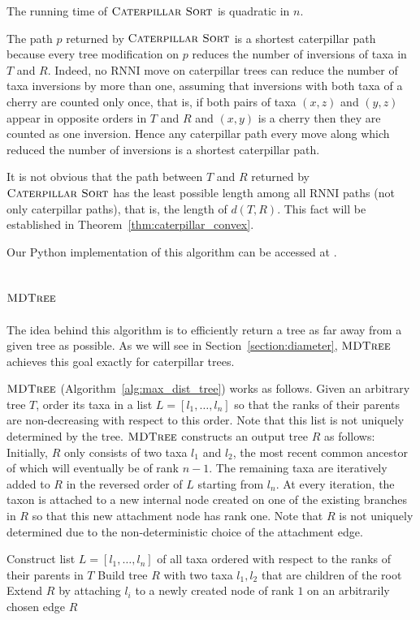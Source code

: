\documentclass{amsart}
\newcommand{\rnni}{\mathrm{RNNI}}
\newcommand{\csort}{\textsc{Caterpillar Sort}}
\newcommand{\mdtree}{\textsc{MDTree}}
\begin{document}
The running time of $\csort$ is quadratic in $n$.

The path $p$ returned by $\csort$ is a shortest caterpillar path because every tree modification on $p$ reduces the number of inversions of taxa in $T$ and $R$.
Indeed, no $\rnni$ move on caterpillar trees can reduce the number of taxa inversions by more than one, assuming that inversions with both taxa of a cherry are counted only once, that is, if both pairs of taxa $(x, z)$ and $(y, z)$ appear in opposite orders in $T$ and $R$ and $(x,y)$ is a cherry then they are counted as one inversion.
Hence any caterpillar path every move along which reduced the number of inversions is a shortest caterpillar path.

It is not obvious that the path between $T$ and $R$ returned by $\csort$ has the least possible length among all $\rnni$ paths (not only caterpillar paths), that is, the length of $d(T, R)$.
This fact will be established in Theorem~\ref{thm:caterpillar_convex}.

Our Python implementation of this algorithm can be accessed at \autocite{Collienne2019}.


\subsection{$\mdtree$}
\label{section:alg_mdtree}

The idea behind this algorithm is to efficiently return a tree as far away from a given tree as possible.
As we will see in Section~\ref{section:diameter}, $\mdtree$ achieves this goal exactly for caterpillar trees.

$\mdtree$ (Algorithm~\ref{alg:max_dist_tree}) works as follows.
Given an arbitrary tree $T$, order its taxa in a list $L = [l_1, \ldots, l_n]$ so that the ranks of their parents are non-decreasing with respect to this order.
Note that this list is not uniquely determined by the tree.
$\mdtree$ constructs an output tree $R$ as follows:
Initially, $R$ only consists of two taxa $l_1$ and $l_2$, the most recent common ancestor of which will eventually be of rank $n - 1$.
The remaining taxa are iteratively added to $R$ in the reversed order of $L$ starting from $l_n$.
At every iteration, the taxon is attached to a new internal node created on one of the existing branches in $R$ so that this new attachment node has rank one.
Note that $R$ is not uniquely determined due to the non-deterministic choice of the attachment edge.

\begin{algorithm}[H]
\caption{$\mdtree(T)$}
\label{alg:max_dist_tree}
\begin{algorithmic}[1]
\STATE Construct list $L=[l_1, \ldots, l_n]$ of all taxa ordered with respect to the ranks of their parents in $T$
\label{alg:mdtree_lineL}
\STATE Build tree $R$ with two taxa $l_1, l_2$ that are children of the root
\STATE Extend $R$ by attaching $l_i$ to a newly created node of rank $1$ on an arbitrarily chosen edge
\label{alg:mdtree_lineAddTaxon}
\ENDFOR
\RETURN $R$
\end{algorithmic}
\end{algorithm}
\end{document}
